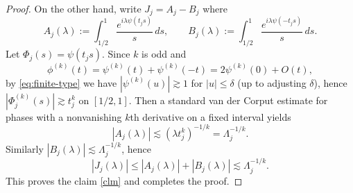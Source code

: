 \documentclass[10pt,a4paper]{amsart}
\begin{document}
\begin{proof}
	
	On the other hand, write $J_j=A_j-B_j$ where
	\[
	A_j(\lambda):=\int_{1/2}^1 \frac{e^{i\lambda\psi(t_js)}}{s}\,ds,
	\qquad
	B_j(\lambda):=\int_{1/2}^1 \frac{e^{i\lambda\psi(-t_js)}}{s}\,ds.
	\]
Let $\Phi_j(s)=\psi(t_js)$. 
	Since $k$ is odd and
\[
\phi^{(k)}(t)=\psi^{(k)}(t)+\psi^{(k)}(-t)=2\psi^{(k)}(0)+O(t),
\]
by \eqref{eq:finite-type} we have $|\psi^{(k)}(u)|\gtrsim 1$ for $|u|\le\delta$
	(up to adjusting $\delta$), hence $|\Phi_j^{(k)}(s)|\gtrsim t_j^k$ on $[1/2,1]$. Then a standard van der Corput estimate for phases with a nonvanishing $k$th derivative on a fixed interval yields
	\[
	|A_j(\lambda)|\lesssim (\lambda t_j^k)^{-1/k}=\Lambda_j^{-1/k}.
	\]
	Similarly $|B_j(\lambda)|\lesssim \Lambda_j^{-1/k}$, hence
	\begin{equation}\label{eq:large}
		|J_j(\lambda)|\le |A_j(\lambda)|+|B_j(\lambda)|\lesssim \Lambda_j^{-1/k}.
	\end{equation}
	This proves the claim \eqref{clm} and completes the proof.\end{proof}
\end{document}
